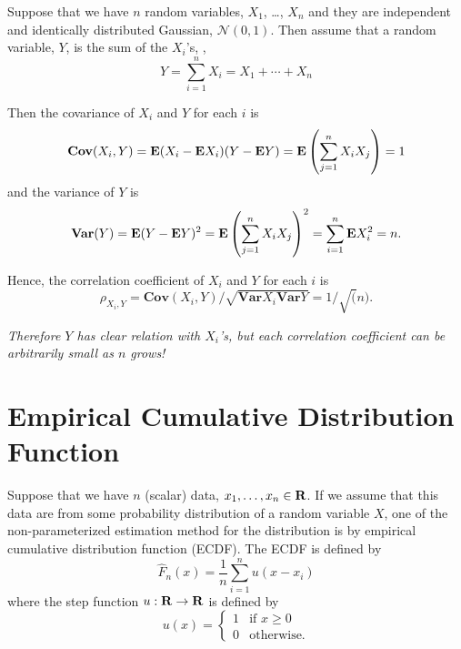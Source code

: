 Suppose that we have $n$ random variables, $X_1$, \ldots, $X_n$
and they are independent and identically distributed Gaussian, $\mathcal{N}(0,1)$.
Then assume that a random variable, $Y$, is the sum of the $X_i$'s,
\ie,
\begin{equation}
Y = \sum_{i=1}^n X_i = X_1 + \cdots + X_n
\end{equation}

Then the covariance of $X_i$ and $Y$ for each $i$ is
\begin{equation}
\mathbf{Cov}(X_i,Y) = {\bf E{}} (X_i - {\bf E{}}{X_i})( Y - {\bf E{}} Y) = {\bf E{}}\left( \sum_{j=1}^n X_iX_j\right) = 1
\end{equation}
and
the variance of $Y$ is
\begin{equation}
\mathbf{Var}(Y) = {\bf E{}} (Y - {\bf E{}} Y)^2 = {\bf E{}}\left( \sum_{j=1}^n X_iX_j\right)^2
= \sum_{i=1}^n {\bf E{}} X_i^2 = n.
\end{equation}

Hence, the correlation coefficient of $X_i$ and $Y$ for each $i$ is
\begin{equation}
\rho_{X_i,Y} = \mathbf{Cov}(X_i,Y) / \sqrt{\mathbf{Var}X_i \mathbf{Var} Y} = 1 / \sqrt(n).
\end{equation}

\emph{Therefore $Y$ has clear relation with $X_i$'s, but each correlation coefficient can be arbitrarily small as $n$ grows!}


\section{Empirical Cumulative Distribution Function}

Suppose that we have $n$ (scalar) data, $x_1, \ldots, x_n \in\mathbf{R}$.
If we assume that this data are from some probability distribution of a random variable $X$,
one of the non-parameterized estimation method for the distribution is by empirical cumulative distribution function (ECDF).
The ECDF is defined by
\begin{equation}
\hat{F}_n(x) = \frac{1}{n} \sum_{i=1}^n u(x-x_i)
\end{equation}
where the step function $u:\mathbf{R}\to\mathbf{R}$ is defined by
\begin{equation}
u(x) = \left\{\begin{array}{ll}
1 & \mbox{if } x \geq 0
\\
0 & \mbox{otherwise.}
\end{array}\right.
\end{equation}

